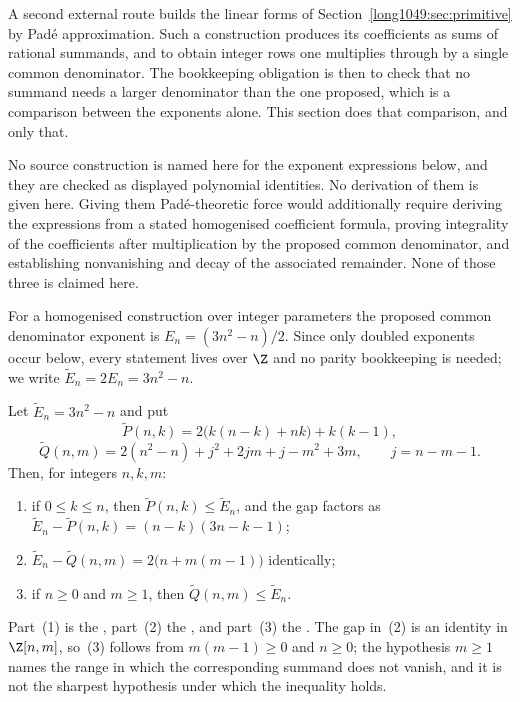 A second external route builds the linear forms of Section~\ref{long1049:sec:primitive}
by Pad\'e approximation.  Such a construction produces its coefficients as sums
of rational summands, and to obtain integer rows one multiplies through by a
single common denominator.  The bookkeeping obligation is then to check that no
summand needs a larger denominator than the one proposed, which is a comparison
between the exponents alone.  This section does that comparison, and only that.

No source construction is named here for the exponent expressions below, and
they are checked as displayed polynomial identities.  No derivation of them is
given here.
Giving them Pad\'e-theoretic force would additionally require deriving the
expressions from a stated homogenised coefficient formula, proving integrality
of the coefficients after multiplication by the proposed common denominator,
and establishing nonvanishing and decay of the associated remainder.  None of
those three is claimed here.

For a
homogenised construction over integer parameters the proposed common
denominator exponent is $E_n=(3n^{2}-n)/2$.  Since only doubled exponents
occur below, every statement lives over $\Z$ and no parity bookkeeping is
needed; we write $\widetilde{E}_n=2E_n=3n^{2}-n$.

\begin{proposition}\label{long1049:res:pade}
Let $\widetilde{E}_n=3n^{2}-n$ and put
\[
 \widetilde{P}(n,k)=2\bigl(k(n-k)+nk\bigr)+k(k-1),
\]
\[
 \widetilde{Q}(n,m)=2(n^{2}-n)+j^{2}+2jm+j-m^{2}+3m,
 \qquad j=n-m-1 .
\]
Then, for integers $n,k,m$:
\begin{enumerate}
\item if $0\le k\le n$, then $\widetilde{P}(n,k)\le\widetilde{E}_n$, and the
gap factors as
$\widetilde{E}_n-\widetilde{P}(n,k)=(n-k)(3n-k-1)$;
\item $\widetilde{E}_n-\widetilde{Q}(n,m)=2\bigl(n+m(m-1)\bigr)$ identically;
\item if $n\ge0$ and $m\ge1$, then $\widetilde{Q}(n,m)\le\widetilde{E}_n$.
\end{enumerate}
\end{proposition}

\noindent Part~(1) is the
, part~(2) the
, and part~(3) the
.  The gap in~(2) is an identity in $\Z[n,m]$, so~(3) follows
from $m(m-1)\ge0$ and $n\ge0$; the hypothesis $m\ge1$ names the range in which
the corresponding summand does not vanish, and it is not the sharpest
hypothesis under which the inequality holds.

